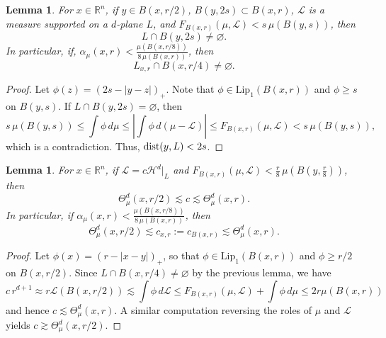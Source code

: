 \documentclass[11pt]{amsart}
\newcommand{\LL}{{\mathcal L}}
\newcommand{\dist}{{\rm dist}}
\newtheorem{lemma}[theorem]{Lemma}
\theoremstyle{definition}
\theoremstyle{remark}
\numberwithin{equation}{section}
\def\cH{{\mathcal{H}}}
\def\gec{\gtrsim}
\def\lec{\lesssim}
\def\lec{\lesssim}
\def\Lip{\textrm{Lip}}
\begin{document}
\begin{lemma} \label{l:LcapB} For $x\in \mathbb{R}^{n}$, if $y\in B(x,r/2)$, $B(y,2s)\subset B(x,r)$, $\LL$ is a measure supported on a $d$-plane $L$, and {$F_{B(x,r)}(\mu,\LL)<{s\,\mu(B(y,s))}$,} then
	\begin{equation}
	\label{e:LcapB-general} 
	L\cap B(y,2s)\neq\varnothing.
	\end{equation} 
	In particular, if, $\alpha_{\mu}(x,r)<\frac{\mu(B(x,r/8))}{8\,\mu(B(x,r))}$, then 
\[
	L_{x,r}\cap B(x,r/4)\neq\varnothing.
\]
\end{lemma}

{
\begin{proof}
	Let $\phi(z) = (2s-|y-z|)_+$. Note that $\phi\in\Lip_{1}(B(x,r))$
	and $\phi\geq s$ on $B(y,s)$. If $L\cap B(y,2s)=\varnothing$, then
\begin{equation*}
	s\,\mu(B(y,s)) 
	\leq \int \phi\, d\mu \leq \left|\int \phi \,d(\mu-\LL)\right| 
	\leq
	F_{B(x,r)}(\mu,\LL)
	<{s}\,\mu(B(y,s)),
\end{equation*}
which is a contradiction. Thus, $\dist(y,L)<2s$.
%	
\end{proof}
}

\begin{lemma}\label{l:cb-theta}
	For $x\in \mathbb{R}^{n}$, if $\LL=c\cH^{d}|_{L}$ and { $F_{B(x,r)}(\mu,\LL)<\frac r8\,\mu(B(y,\frac r8))$,} then
	\begin{equation}\label{e:cb-theta-gen}
	\Theta^d_{\mu}(x,r/2) \lec  c \lec \Theta^d_{\mu}(x,r).
	\end{equation}
	In particular, if $\alpha_{\mu}(x,r) < \frac{\mu(B(x,r/8))}{8\,\mu(B(x,r))}$, then 
	\begin{equation}\label{e:cb-theta}
		 \Theta^d_{\mu}(x,r/2) \lec  c_{x,r}:=c_{B(x,r)} \lec \Theta^d_{\mu}(x,r).
	\end{equation}
\end{lemma}

\begin{proof}
	Let $\phi(x) = (r-|x-y|)_+$, so that
	 $\phi\in \Lip_{1}(B(x,r))$ and $\phi\geq r/2$ on $B(x,r/2)$. Since $L\cap B(x,r/4)\neq\varnothing$ by the previous lemma, we have		
	\[
	c\,r^{d+1}
	\approx r\LL(B(x,r/2))
	\lec \int \phi\, d\LL
	\leq F_{B(x,r)}(\mu,\LL) +  \int \phi \,d\mu
	\leq 2r \mu(B(x,r))
	\]
	and hence $c \lesssim \Theta^d_{\mu}(x,r)$. A similar computation reversing the roles of $\mu$ and $\LL$ yields $c \gec  \Theta^d_{\mu}(x,r/2)$. 
\end{proof}
 
\end{document}
